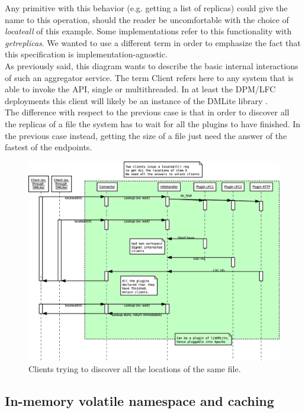 \documentclass[12pt]{article} %
\begin{document}
Any primitive with this behavior (e.g. getting a list of replicas) could give the name to this operation, should the reader be uncomfortable with the choice of \textit{locateall} of this example. Some implementations refer to this functionality with \textit{getreplicas}. We wanted to use a different term in order to emphasize the fact that this specification is implementation-agnostic.\\

As previously said, this diagram wants to describe the basic internal interactions of such an aggregator service. The term Client refers here to any system that is able to invoke the API, single or multithreaded. In at least the DPM/LFC deployments this client will likely be an instance of the DMLite library \cite{dpmnew}.\\
 
The difference with respect to the previous case is that in order to discover all the replicas of a file the system has to wait for all the plugins to have finished. In the previous case instead, getting the size of a file just need the answer of the fastest of the endpoints.

 \begin{figure}
\begin{center}
\includegraphics[width=28pc]{collab1_locations.eps}
\end{center}
\caption{\label{fig_collab1_loc}Clients trying to discover all the locations of the same file.}
\end{figure}


\subsection{In-memory volatile namespace and caching}
\end{document}
